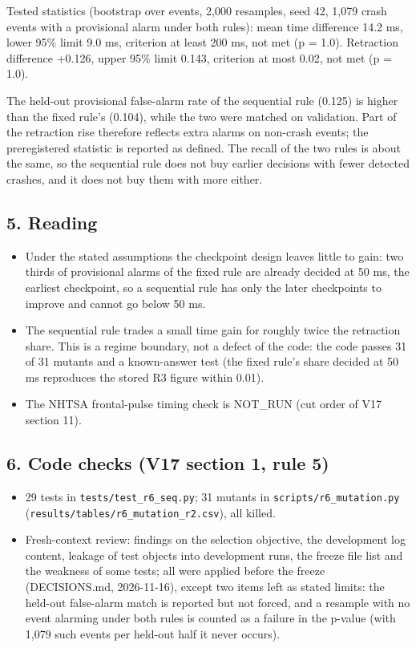 Tested statistics (bootstrap over events, 2,000 resamples, seed 42, 1,079 crash events with a provisional alarm under both rules): mean time difference 14.2 ms, lower 95\% limit 9.0 ms, criterion at least 200 ms, not met (p = 1.0). Retraction difference +0.126, upper 95\% limit 0.143, criterion at most 0.02, not met (p = 1.0).

The held-out provisional false-alarm rate of the sequential rule (0.125) is higher than the fixed rule's (0.104), while the two were matched on validation. Part of the retraction rise therefore reflects extra alarms on non-crash events; the preregistered statistic is reported as defined. The recall of the two rules is about the same, so the sequential rule does not buy earlier decisions with fewer detected crashes, and it does not buy them with more either.

\subsection*{5. Reading}

\begin{itemize}
\item Under the stated assumptions the checkpoint design leaves little to gain: two thirds of provisional alarms of the fixed rule are already decided at 50 ms, the earliest checkpoint, so a sequential rule has only the later checkpoints to improve and cannot go below 50 ms.
\item The sequential rule trades a small time gain for roughly twice the retraction share. This is a regime boundary, not a defect of the code: the code passes 31 of 31 mutants and a known-answer test (the fixed rule's share decided at 50 ms reproduces the stored R3 figure within 0.01).
\item The NHTSA frontal-pulse timing check is NOT\_RUN (cut order of V17 section 11).
\end{itemize}

\subsection*{6. Code checks (V17 section 1, rule 5)}

\begin{itemize}
\item 29 tests in \texttt{tests/test\_r6\_seq.py}; 31 mutants in \texttt{scripts/r6\_mutation.py} (\texttt{results/tables/r6\_mutation\_r2.csv}), all killed.
\item Fresh-context review: findings on the selection objective, the development log content, leakage of test objects into development runs, the freeze file list and the weakness of some tests; all were applied before the freeze (DECISIONS.md, 2026-11-16), except two items left as stated limits: the held-out false-alarm match is reported but not forced, and a resample with no event alarming under both rules is counted as a failure in the p-value (with 1,079 such events per held-out half it never occurs).
\end{itemize}


